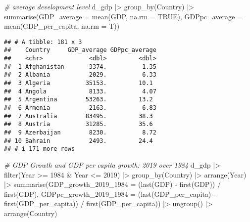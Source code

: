\documentclass[
]{article}
\newenvironment{Shaded}{\begin{snugshade}}{\end{snugshade}}
\newcommand{\AttributeTok}[1]{\textcolor[rgb]{0.77,0.63,0.00}{#1}}
\newcommand{\CommentTok}[1]{\textcolor[rgb]{0.56,0.35,0.01}{\textit{#1}}}
\newcommand{\ConstantTok}[1]{\textcolor[rgb]{0.00,0.00,0.00}{#1}}
\newcommand{\DecValTok}[1]{\textcolor[rgb]{0.00,0.00,0.81}{#1}}
\newcommand{\FunctionTok}[1]{\textcolor[rgb]{0.00,0.00,0.00}{#1}}
\newcommand{\NormalTok}[1]{#1}
\newcommand{\SpecialCharTok}[1]{\textcolor[rgb]{0.00,0.00,0.00}{#1}}
\begin{document}
\begin{Shaded}
\begin{Highlighting}[]
\CommentTok{\# average development level}
\NormalTok{d\_gdp }\SpecialCharTok{|\textgreater{}} 
  \FunctionTok{group\_by}\NormalTok{(Country) }\SpecialCharTok{|\textgreater{}}
  \FunctionTok{summarise}\NormalTok{(}\AttributeTok{GDP\_average =} \FunctionTok{mean}\NormalTok{(GDP, }\AttributeTok{na.rm =} \ConstantTok{TRUE}\NormalTok{),}
            \AttributeTok{GDPpc\_average =} \FunctionTok{mean}\NormalTok{(GDP\_per\_capita, }\AttributeTok{na.rm =}\NormalTok{ T))}
\end{Highlighting}
\end{Shaded}

\begin{verbatim}
## # A tibble: 181 x 3
##    Country     GDP_average GDPpc_average
##    <chr>             <dbl>         <dbl>
##  1 Afghanistan       3374.          1.35
##  2 Albania           2029.          6.33
##  3 Algeria          35153.         10.1 
##  4 Angola            8133.          4.07
##  5 Argentina        53263.         13.2 
##  6 Armenia           2163.          6.83
##  7 Australia        83495.         38.3 
##  8 Austria          31285.         35.6 
##  9 Azerbaijan        8230.          8.72
## 10 Bahrain           2493.         24.4 
## # i 171 more rows
\end{verbatim}

\begin{Shaded}
\begin{Highlighting}[]
\CommentTok{\# GDP Growth and GDP per capita growth: 2019 over 1984}
\NormalTok{d\_gdp }\SpecialCharTok{|\textgreater{}} 
  \FunctionTok{filter}\NormalTok{(Year }\SpecialCharTok{\textgreater{}=} \DecValTok{1984} \SpecialCharTok{\&}\NormalTok{ Year }\SpecialCharTok{\textless{}=} \DecValTok{2019}\NormalTok{) }\SpecialCharTok{|\textgreater{}}
  \FunctionTok{group\_by}\NormalTok{(Country) }\SpecialCharTok{|\textgreater{}}
  \FunctionTok{arrange}\NormalTok{(Year) }\SpecialCharTok{|\textgreater{}}
  \FunctionTok{summarise}\NormalTok{(}\AttributeTok{GDP\_growth\_2019\_1984 =}\NormalTok{ (}\FunctionTok{last}\NormalTok{(GDP) }\SpecialCharTok{{-}} \FunctionTok{first}\NormalTok{(GDP)) }\SpecialCharTok{/} \FunctionTok{first}\NormalTok{(GDP),}
            \AttributeTok{GDPpc\_growth\_2019\_1984 =}\NormalTok{ (}\FunctionTok{last}\NormalTok{(GDP\_per\_capita) }\SpecialCharTok{{-}} \FunctionTok{first}\NormalTok{(GDP\_per\_capita)) }\SpecialCharTok{/} \FunctionTok{first}\NormalTok{(GDP\_per\_capita)) }\SpecialCharTok{|\textgreater{}}
  \FunctionTok{ungroup}\NormalTok{() }\SpecialCharTok{|\textgreater{}}
  \FunctionTok{arrange}\NormalTok{(Country)}
\end{Highlighting}
\end{Shaded}
\end{document}
